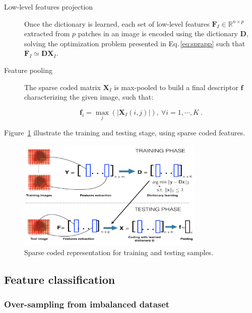 \begin{description}
\item[Low-level features projection] Once the dictionary is learned, each set of low-level features $\mathbf{F}_{I} \in \mathbb{R}^{n \times p}$ extracted from $p$ patches in an image is encoded using the dictionary $\mathbf{D}$, solving the optimization problem presented in Eq.\,\ref{eq:sprapp} such that $\mathbf{F}_{I} \simeq \mathbf{DX}_{I}$.

\item[Feature pooling] The sparse coded matrix $\mathbf{X}_{I}$ is max-pooled to build a final descriptor $\mathbf{f}$ characterizing the given image, such that:

\begin{equation}
  \mathbf{f}_i = \max_{j}\left(|\mathbf{X}_{I}(i,j)|\right), \ \forall i = 1, \cdots, K\ .
\end{equation}


\end{description}
Figure~\ref{fig:sparsecoding} illustrate the training and testing stage, using sparse coded features.
\begin{figure}
\begin{center}
\includegraphics[width = 0.8\textwidth]{sparse-coding-melanoma.png}
\end{center}
\caption{Sparse coded representation for training and testing samples.}
\label{fig:sparsecoding}
\end{figure}
\subsection{Feature classification}

\subsubsection{Over-sampling from imbalanced dataset}

